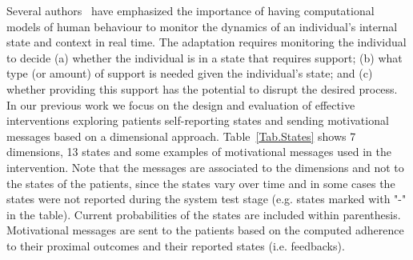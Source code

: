 \documentclass[graybox]{svmult}
\begin{document}
Several authors~\cite{Murray2016, Nahum-Shani, MacPhail} have emphasized the importance of having computational models of human behaviour to monitor the dynamics of an individual's internal state and context in real time. The adaptation requires monitoring the individual to decide (a) whether the individual is in a state that requires support; (b) what type (or amount) of support is needed given the individual's state; and (c) whether providing this support has the potential to disrupt the desired process. In our previous work we focus on the design and evaluation of effective interventions exploring patients self-reporting states and sending motivational messages based on a dimensional approach. Table~\ref{Tab.States} shows 7 dimensions, 13 states and some examples of motivational messages used in the intervention. Note that the messages are associated to the dimensions and not to the states of the patients, since the states vary over time and in some cases the states were not reported during the system test stage (e.g. states marked with "-" in the table). Current probabilities of the states are included within parenthesis. Motivational messages are sent to the patients based on the computed adherence to their proximal outcomes and their reported states (i.e. feedbacks). 
\end{document}
